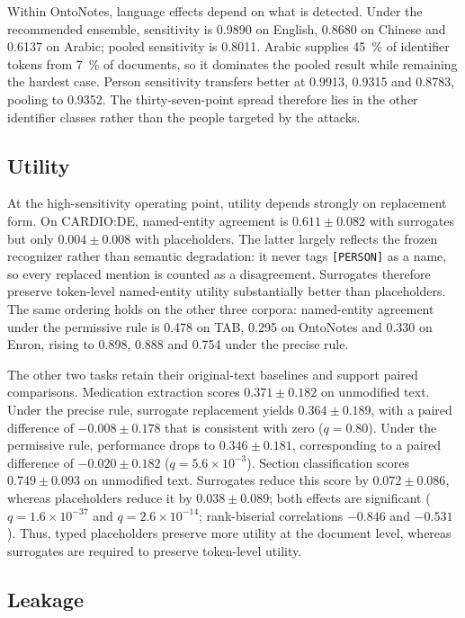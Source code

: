 Within OntoNotes, language effects depend on what is detected. Under the recommended ensemble,
sensitivity is 0.9890 on English, 0.8680 on Chinese and 0.6137 on Arabic; pooled sensitivity is
0.8011.
Arabic supplies \SI{45}{\percent} of identifier tokens from \SI{7}{\percent} of documents, so it
dominates the pooled result while remaining the hardest case. Person sensitivity transfers better
at 0.9913, 0.9315 and 0.8783, pooling to 0.9352. The thirty-seven-point spread therefore lies in the
other identifier classes rather than the people targeted by the attacks.

\subsection{Utility}\label{sec:results-utility}

At the high-sensitivity operating point, utility depends strongly on replacement form. On CARDIO:DE, named-entity agreement is $0.611\pm0.082$ with surrogates but only $0.004\pm0.008$ with placeholders. The latter largely reflects the frozen recognizer rather than semantic degradation: it never tags \texttt{[PERSON]} as a name, so every replaced mention is counted as a disagreement. Surrogates therefore preserve token-level named-entity utility substantially better than placeholders. The same ordering holds on the other three corpora: named-entity agreement under the permissive rule is 0.478 on TAB, 0.295 on OntoNotes and 0.330 on Enron, rising to 0.898, 0.888 and 0.754 under the precise rule.

The other two tasks retain their original-text baselines and support paired comparisons. Medication extraction scores $0.371\pm0.182$ on unmodified text. Under the precise rule, surrogate replacement yields $0.364\pm0.189$, with a paired difference of $-0.008\pm0.178$ that is consistent with zero ($q=0.80$). Under the permissive rule, performance drops to $0.346\pm0.181$, corresponding to a paired difference of $-0.020\pm0.182$ ($q=5.6\times10^{-3}$). Section classification scores $0.749\pm0.093$ on unmodified text. Surrogates reduce this score by $0.072\pm0.086$, whereas placeholders reduce it by $0.038\pm0.089$; both effects are significant ($q=1.6\times10^{-37}$ and $q=2.6\times10^{-14}$; rank-biserial correlations $-0.846$ and $-0.531$). Thus, typed placeholders preserve more utility at the document level, whereas surrogates are required to preserve token-level utility.

\subsection{Leakage}\label{sec:results-leakage}



